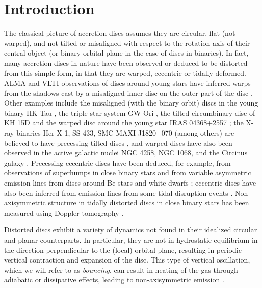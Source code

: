 \documentclass[fleqn,usenatbib]{mnras}
\begin{document}
\section{Introduction}
\label{INTRO}
The classical picture of accretion discs assumes they are circular, flat (not warped), and not tilted or misaligned with respect to the rotation axis of their central object (or binary orbital plane in the case of discs in binaries). In fact, many accretion discs in nature have been observed or deduced to be distorted from this simple form, in that they are warped, eccentric or tidally deformed. ALMA and VLTI observations of discs around young stars have inferred warps from the shadows cast by a misaligned inner disc on the outer part of the disc \citep{kluska2020family, bohn2022probing}. Other examples include the misaligned (with the binary orbit) %
discs in the young binary HK Tau \citep{jensen2014misaligned,manara2019observational}, the triple star system GW Ori \citep{kraus2020triple, bi2020gw}, the tilted circumbinary disc of KH 15D \citep{chiang2004circumbinary,poon2021constraining} and the warped disc around the young star IRAS 04368+2557 \citep{sakai2019warped,villenave2024jwst}; the X-ray binaries Her X-1, SS 433, SMC MAXI J1820+070 (among others) are believed to have precessing tilted discs \citep{katz1973thirty, gerend1976optical, clarkson2003long, begelman2006nature, kotze2012characterizing, thomas2022large}, and warped discs have also been observed in the active galactic nuclei NGC 4258, NGC 1068, and the Circinus galaxy \citep{miyoshi1995evidence, herrnstein1996warp, greenhill2003warped}. Precessing eccentric discs have been deduced, for example, from observations of superhumps in close binary stars \citep{2005PASP..117.1204P} and from variable asymmetric emission lines from discs around Be stars \citep{2016ASPC..506....3O} and white dwarfs \citep{2021MNRAS.508.5657M}; eccentric discs have also been inferred from emission lines from some tidal disruption events \citep[e.g.][]{2022A&A...666A...6W}. Non-axisymmetric structure in tidally distorted discs in close binary stars has been measured using Doppler tomography \citep{2005Ap&SS.296..403M}. 


Distorted discs exhibit a variety of dynamics not found in their idealized circular and planar counterparts. In particular, they are not in hydrostatic equilibrium in the direction perpendicular to the (local) orbital plane, resulting in periodic vertical contraction and expansion of the disc. This type of vertical oscillation, which we will refer to as \textit{bouncing}, can result in heating of the gas through adiabatic or dissipative effects, leading to non-axisymmetric emission \citep{ogilvie2002tidally, liska2021disc, kaaz2023nozzle}.
\end{document}
